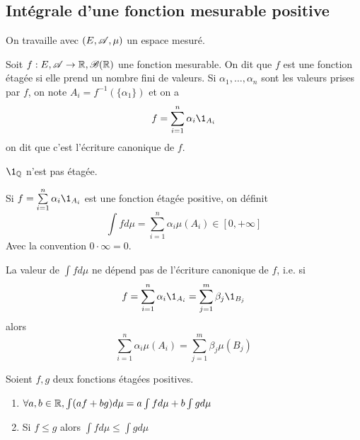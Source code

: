 \subsection{Intégrale d'une fonction mesurable positive}


On travaille avec $(E,\mathscr{A},\mu)$ un espace mesuré.

\begin{definition}
	Soit $f: E, \mathscr{A} \to \mathbb{R}, \mathscr{B}(\mathbb{R})$ une fonction mesurable. On dit que $f$ est une fonction étagée
	si elle prend un nombre fini de valeurs.
	Si $\alpha_1, \dots, \alpha_n$ sont les valeurs prises par $f$, on note
	$A_i = f^{-1}(\{\alpha_1\})$ et on a
	$$ f = \sum_{i=1}^n \alpha_i \1_{A_i} $$
	on dit que c'est l'écriture canonique de $f$.
\end{definition}

\begin{remarque}
	$\1_{\Q}$ n'est pas étagée.
\end{remarque}


\begin{definition}
	Si $f = \sum\limits_{i=1}^n \alpha_i \1_{A_i}$ est une fonction étagée positive, on définit
	$$ \int f d\mu = \sum_{i=1}^n \alpha_i \mu(A_i) \in [0, +\infty] $$
	Avec la convention $0 \cdot \infty = 0$.
\end{definition}


\begin{remarque}
	La valeur de $\int f d\mu$ ne dépend pas de l'écriture canonique de $f$, i.e. si
	$$ f = \sum_{i=1}^n \alpha_i \1_{A_i} = \sum_{j=1}^m \beta_j \1_{B_j} $$
	alors
	$$ \sum_{i=1}^n \alpha_i \mu(A_i) = \sum_{j=1}^m \beta_j \mu(B_j) $$
\end{remarque} %

\begin{prop}
	Soient $f,g$ deux fonctions étagées positives.
	\begin{enumerate}
		\item $  \forall a, b \in \mathbb{R}, \int (af + bg) d\mu = a \int f d\mu + b \int g d\mu$
		\item Si $f \leq g$ alors $\int f d\mu \leq \int g d\mu$
	\end{enumerate}
\end{prop}

